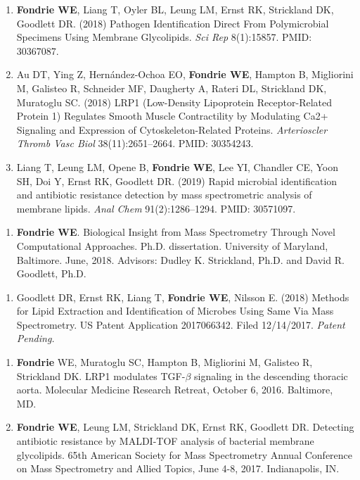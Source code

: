 \documentclass{article}
\newcommand{\mysection}[1]{\vspace{1ex}{\bf #1}}
\begin{document}
\begin{enumerate}
  \item \textbf{Fondrie WE}, Liang T, Oyler BL, Leung LM, Ernst RK, Strickland
    DK, Goodlett DR. (2018) Pathogen Identification Direct From Polymicrobial
    Specimens Using Membrane Glycolipids. \textit{Sci Rep} 8(1):15857. PMID:
    30367087.

  \item Au DT, Ying Z, Hernández-Ochoa EO, \textbf{Fondrie WE}, Hampton B,
    Migliorini M, Galisteo R, Schneider MF, Daugherty A, Rateri DL, Strickland
    DK, Muratoglu SC. (2018) LRP1 (Low-Density Lipoprotein Receptor-Related
    Protein 1) Regulates Smooth Muscle Contractility by Modulating Ca2+
    Signaling and Expression of Cytoskeleton-Related Proteins.
    \textit{Arterioscler Thromb Vasc Biol} 38(11):2651--2664. PMID: 30354243.

  \item Liang T, Leung LM, Opene B, \textbf{Fondrie WE}, Lee YI, Chandler CE,
    Yoon SH, Doi Y, Ernst RK, Goodlett DR. (2019) Rapid microbial identification
    and antibiotic resistance detection by mass spectrometric analysis of
    membrane lipids. \textit{Anal Chem} 91(2):1286--1294. PMID: 30571097.
\end{enumerate}

\mysection{Additional Publications}
\begin{enumerate}
  \item {\bf Fondrie WE}. Biological Insight from Mass Spectrometry Through
    Novel Computational Approaches. Ph.D. dissertation. University of Maryland,
    Baltimore. June, 2018. Advisors: Dudley K. Strickland, Ph.D. and David R.
    Goodlett, Ph.D.
\end{enumerate}

\mysection{Patents}
\begin{enumerate}
  \item Goodlett DR, Ernst RK, Liang T, {\bf Fondrie WE}, Nilsson E. (2018)
    Methods for Lipid Extraction and Identification of Microbes Using Same Via
    Mass Spectrometry. US Patent Application 2017066342. Filed 12/14/2017. {\it
      Patent Pending.}
\end{enumerate}

\mysection{Oral Presentations}
\begin{enumerate}
  \item {\bf Fondrie} WE, Muratoglu SC, Hampton B, Migliorini M, Galisteo R,
    Strickland DK. LRP1 modulates TGF-$\beta$ signaling in the descending
    thoracic aorta. Molecular Medicine Research Retreat, October 6, 2016.
    Baltimore, MD.

  \item {\bf Fondrie WE}, Leung LM, Strickland DK, Ernst RK, Goodlett DR.
    Detecting antibiotic resistance by MALDI-TOF analysis of bacterial membrane
    glycolipids. 65th American Society for Mass Spectrometry Annual Conference
    on Mass Spectrometry and Allied Topics, June 4-8, 2017. Indianapolis, IN.
\end{enumerate}
\end{document}
